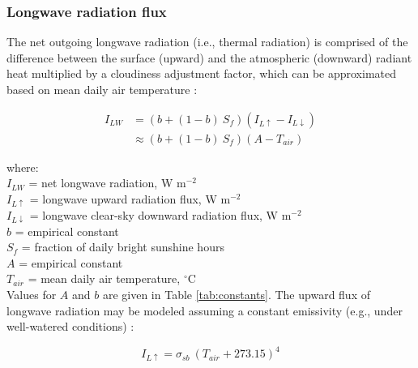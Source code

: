 \subsubsection{Longwave radiation flux}
\label{sec:rl}
The net outgoing longwave radiation (i.e., thermal radiation) is comprised of the difference between the surface (upward) and the atmospheric (downward) radiant heat multiplied by a cloudiness adjustment factor, which can be approximated based on mean daily air temperature \parencite{linacre68}:

\begin{equation}
\label{eq:rnl}
	\begin{split}
		I_{LW} & = \left(b + (1-b)\: S_f \right) 
		           \left(I_{L\uparrow} - I_{L\downarrow} \right) \\
		       & \approx \left(b + (1-b)\: S_f \right) 
		         \left(A - T_{air} \right)
	\end{split}
\end{equation}

\noindent where: \\
\indent $I_{LW}$ = net longwave radiation, W m$^{-2}$ \\
\indent $I_{L\uparrow}$ = longwave upward radiation flux, W m$^{-2}$\\
\indent $I_{L\downarrow}$ = longwave clear-sky downward radiation flux, W m$^{-2}$\\
\indent $b$ = empirical constant\\
\indent $S_f$ = fraction of daily bright sunshine hours \\
\indent $A$ = empirical constant \\
\indent $T_{air}$ = mean daily air temperature, $^{\circ}$C \\

\noindent Values for $A$ and $b$ are given in Table \ref{tab:constants}. 
The upward flux of longwave radiation may be modeled assuming a constant emissivity (e.g., under well-watered conditions) \parencite[Eq. 21]{linacre68}:

\begin{equation}
\label{eq:rlu}
	I_{L\uparrow} = \sigma_{sb}\: \left(T_{air} + 273.15\right)^4
\end{equation}

